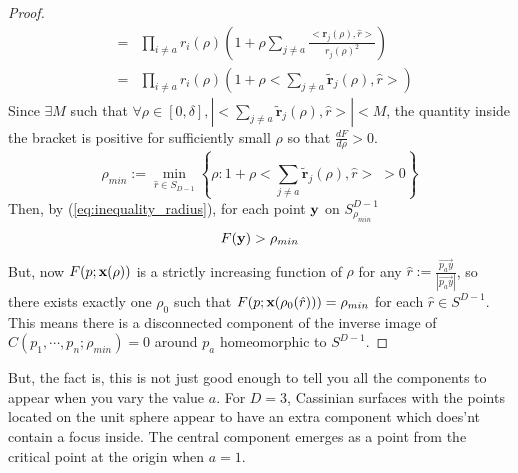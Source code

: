 \documentclass{article}
\begin{document}
\begin{proof}
\begin{eqnarray}
&=&\prod_{i \ne a } r_i(\rho) \left(1 + \rho\sum_{j\ne a } \frac{ <\mathbf{r}_{j}(\rho),\hat{r}>}{r_j(\rho)^2}\right) \nonumber\\
&=&\prod_{i \ne a } r_i(\rho) \left(1 +  \rho<\sum_{j\ne a }\mathbf{\tilde{r}}_{j}(\rho),\hat{r}> \right)
\end{eqnarray}
Since $\exists M$ such that $\forall \rho \in [0,\delta], |<\sum_{j\ne a }\mathbf{\tilde{r}}_{j}(\rho),\hat{r}>| < M$, the quantity inside the bracket is positive for sufficiently small $\rho$ so that $\frac{d F}{d \rho}>0$. 
\begin{equation}
\label{}
\rho_{min} := \min_{\hat{r}\in S_{D-1}}\left\{\rho: 1 +  \rho<\sum_{j\ne a }\mathbf{\tilde{r}}_{j}(\rho),\hat{r}> \; > 0 \right\}
\end{equation}
Then, by (\ref{eq:inequality_radius}), for each point $\textbf y$ on $S^{D-1}_{\rho_{min}}$
\begin{equation}
\label{}
F(\textbf y) > \rho_{min}
\end{equation}
But, now $F(p;\textbf x(\rho))$ is a strictly increasing function of $\rho$ for any $\hat{r} := \frac{\overrightarrow{p_a y}}{|\overrightarrow{p_a y}|}$, so there exists exactly one $\rho_0$ such that $F(p;\textbf x(\rho_0(\hat{r}))) = \rho_{min}$ for each $\hat{r} \in S^{D-1}$. This means there is a disconnected component of the inverse image of $C(p_1,\cdots,p_n;\rho_{min}) =0$ around $p_a$ homeomorphic to $S^{D-1}$.
\end{proof}
But, the fact is, this is not just good enough to tell you all the components to appear when you vary the value $a$. For $D=3$, Cassinian surfaces with the points located on the unit sphere appear to have an extra component which does'nt contain a focus inside. The central component emerges as a point from the critical point at the origin when $a=1$.
\end{document}
